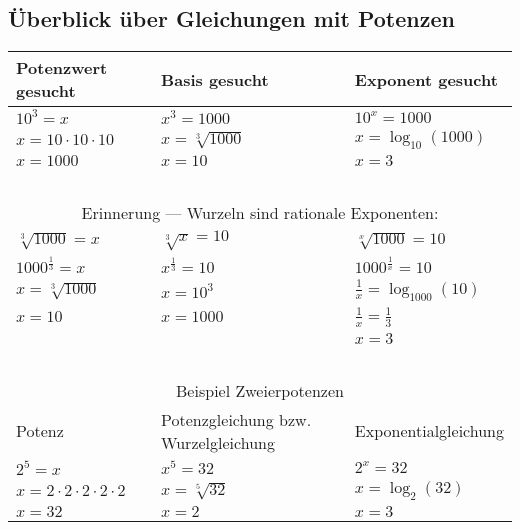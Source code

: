 

\subsection{Überblick über Gleichungen mit Potenzen}

\begin{tabular}{|p{52mm}|p{52mm}|p{52mm}|}
  \hline
  Potenzwert gesucht       & Basis gesucht                       &  Exponent gesucht          \\
  \hline
  $10^3=x$                 & $x^3=1000$                           &  $10^x=1000$               \\
  \hline
  $x=10\cdot{}10\cdot{}10$ & $x=\sqrt[3]{1000}$                   & $x =  \log_{10}(1000)$     \\
  $x=1000$                 & $x=10$                               & $x =  3$                   \\
  \hline
  \multicolumn{3}{c}{\,}\\ %
  \multicolumn{3}{c}{Erinnerung --- Wurzeln sind rationale Exponenten:}\\
  \hline
  $\sqrt[3]{1000}=x$        & $\sqrt[3]{x}=10$                    &  $\sqrt[x]{1000}=10$               \\
  \hline
  $1000^{\frac{1}{3}}=x$     & $x^{\frac{1}{3}}=10$                   &  $1000^{\frac{1}{x}}=10$               \\
  $x=\sqrt[3]{1000}$       & $x=10^3$                             & $\frac{1}{x} =  \log_{1000}(10)$      \\
  $x=10$                   & $x=1000$                             & $\frac{1}{x} =  \frac{1}{3}$         \\
                           &                                      & $x = 3$                      \\
  \hline
  \multicolumn{3}{c}{\,}\\ %
  \multicolumn{3}{c}{Beispiel Zweierpotenzen}\\
  \hline
  Potenz                   & Potenzgleichung bzw. Wurzelgleichung &  Exponentialgleichung     \\
  \hline 
  $2^5=x$                  & $x^5=32$                             &  $2^x=32$                  \\
  \hline
  $x=2\cdot{}2\cdot{}2\cdot{}2\cdot{2}$ & $x=\sqrt[5]{32}$        & $x =  \log_{2}(32)$        \\
  $x=32$                   & $x=2$                                & $x  =  3$                  \\
  \hline
\end{tabular}

